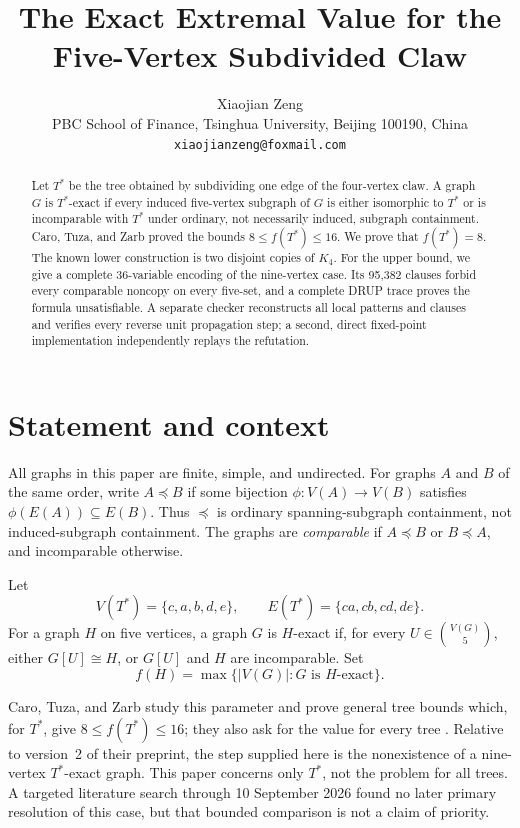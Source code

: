 \documentclass[11pt]{article}
\title{The Exact Extremal Value for the Five-Vertex Subdivided Claw}
\author{Xiaojian Zeng\\
  \small PBC School of Finance, Tsinghua University, Beijing 100190, China\\
  \small \texttt{xiaojianzeng@foxmail.com}}
\date{}
\theoremstyle{definition}
\newcommand{\Tstar}{T^{*}}
\begin{document}
\maketitle

\begin{abstract}
Let \(\Tstar\) be the tree obtained by subdividing one edge of the
four-vertex claw.  A graph \(G\) is \(\Tstar\)-exact if every induced
five-vertex subgraph of \(G\) is either isomorphic to \(\Tstar\) or is
incomparable with \(\Tstar\) under ordinary, not necessarily induced,
subgraph containment.  Caro, Tuza, and Zarb proved the bounds
\(8\leq f(\Tstar)\leq16\).  We prove that \(f(\Tstar)=8\).  The known lower
construction is two disjoint copies of \(K_4\).  For the upper bound, we
give a complete 36-variable encoding of the nine-vertex case.  Its
95,382 clauses forbid every comparable noncopy on every five-set, and a
complete DRUP trace proves the formula unsatisfiable.  A separate checker
reconstructs all local patterns and clauses and verifies every reverse unit
propagation step; a second, direct fixed-point implementation independently
replays the refutation.
\end{abstract}

\section{Statement and context}

All graphs in this paper are finite, simple, and undirected.  For graphs
\(A\) and \(B\) of the same order, write \(A\preceq B\) if some bijection
\(\phi:V(A)\to V(B)\) satisfies
\(\phi(E(A))\subseteq E(B)\).  Thus \(\preceq\) is ordinary spanning-subgraph
containment, not induced-subgraph containment.  The graphs are
\emph{comparable} if \(A\preceq B\) or \(B\preceq A\), and incomparable
otherwise.

Let
\[
 V(\Tstar)=\{c,a,b,d,e\},\qquad
 E(\Tstar)=\{ca,cb,cd,de\}.
\]
For a graph \(H\) on five vertices, a graph \(G\) is \(H\)-exact if, for
every \(U\in\binom{V(G)}5\), either \(G[U]\cong H\), or \(G[U]\) and
\(H\) are incomparable.  Set
\[
 f(H)=\max\{|V(G)|:G\text{ is }H\text{-exact}\}.
\]

Caro, Tuza, and Zarb study this parameter and prove general tree bounds
which, for \(\Tstar\), give
\(8\leq f(\Tstar)\leq16\); they also ask for the value for every tree
\cite{CaroTuzaZarb2026}.  Relative to version~2 of their preprint, the step
supplied here is the nonexistence of a nine-vertex \(\Tstar\)-exact graph.
This paper concerns only \(\Tstar\), not the problem for all trees.  A
targeted literature search through 10 September 2026 found no later primary
resolution of this case, but that bounded comparison is not a claim of
priority.
\end{document}
